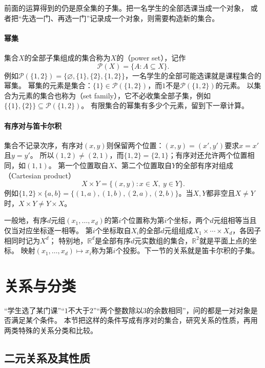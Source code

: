 前面的运算得到的仍是原全集的子集。把一名学生的全部选课当成一个对象，
或者把“先选一门、再选一门”记录成一个对象，则需要构造新的集合。

\paragraph{幂集}
集合$X$的全部子集组成的集合称为$X$的（power set），记作
\[
 \mathcal P(X)=\{A:A\subseteq X\}.
\]
例如$\mathcal P(\{1,2\})=\{\varnothing,\{1\},\{2\},\{1,2\}\}$，一名学生的全部可能选课就是课程集合的幂集。
幂集的元素是集合：$\{1\}\in\mathcal P(\{1,2\})$，而$1$不是$\mathcal P(\{1,2\})$的元素。
以集合为元素的集合也称为（set family），它不必收集全部子集，例如$\{\{1\},\{2\}\}\subseteq\mathcal P(\{1,2\})$。
有限集合的幂集有多少个元素，留到下一章计算。

\paragraph{有序对与笛卡尔积}
集合不记录次序，有序对$(x,y)$则保留两个位置：$(x,y)=(x',y')$要求$x=x'$且$y=y'$。
所以$(1,2)\neq(2,1)$，而$\{1,2\}=\{2,1\}$；有序对还允许两个位置相同，如$(1,1)$。
第一个位置取自$X$、第二个位置取自$Y$的全部有序对组成（Cartesian product）
\[
 X\times Y=\{(x,y):x\in X,\ y\in Y\}.
\]
例如$\{1,2\}\times\{a,b\}=\{(1,a),(1,b),(2,a),(2,b)\}$。当$X,Y$都非空且$X\neq Y$时，$X\times Y\neq Y\times X$。

一般地，有序$d$元组$(x_1,\ldots,x_d)$的第$i$个位置称为第$i$个坐标，两个$d$元组相等当且仅当对应坐标逐一相等。
第$i$个坐标取自$X_i$的全部$d$元组组成$X_1\times\cdots\times X_d$，各因子相同时记为$X^d$；
特别地，$\mathbb R^d$是全部有序$d$元实数组的集合，$\mathbb R^2$就是平面上点的坐标。
映射$(x_1,\ldots,x_d)\mapsto x_i$称为第$i$个投影。下一节的关系就是笛卡尔积的子集。

\section{关系与分类}
\label{sec:prelim-binary-relations}

“学生选了某门课”“$1$不大于$2$”“两个整数除以$3$的余数相同”，问的都是一对对象是否满足某个条件。
本节把这样的条件写成有序对的集合，研究关系的性质，再用两类特殊的关系分类和比较。

\subsection{二元关系及其性质}
\label{sec:prelim-binary-relation-definition}
\label{sec:prelim-relation-properties}

